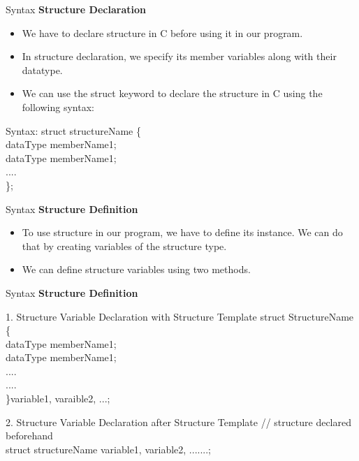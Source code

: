 \documentclass[13pt]{beamer}
\begin{document}
\begin{frame}{Syntax}
{\textbf{Structure Declaration}}
\begin{itemize}
    \item We have to declare structure in C before using it in our program. 
    \item In structure declaration, we specify its member variables along with their datatype.
    \item We can use the struct keyword to declare the structure in C using the following syntax:
\end{itemize}
\begin{block}{Syntax:}
    struct structureName \{ \\
    dataType memberName1; \\
    dataType memberName1; \\
    .... \\
\};
\end{block}
\end{frame}

\begin{frame}{Syntax}
{\textbf{Structure Definition}}
\begin{itemize}
    \item To use structure in our program, we have to define its instance. We can do that by creating variables of the structure type.
    \item We can define structure variables using two methods.
\end{itemize}

\end{frame}

\begin{frame}{Syntax}
{\textbf{Structure Definition}}
\begin{block}{1. Structure Variable Declaration with Structure Template}
    struct StructureName \{ \\
    dataType memberName1; \\
    dataType memberName1; \\
    .... \\
    .... \\
\}variable1, varaible2, ...;
\end{block} 
\begin{block}{2. Structure Variable Declaration after Structure Template}
    // structure declared beforehand \\
struct structureName variable1, variable2, .......;
\end{block}
\end{frame}
\end{document}
